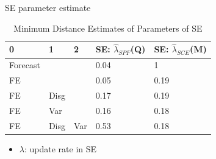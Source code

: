\documentclass{beamer}
\begin{document}
\begin{frame}{SE parameter estimate}
	\begin{table}
		\centering
		\caption{Minimum Distance Estimates of Parameters of SE}
		\label{GMM_Est_SE_Table}
		\begin{tabular}{lllll}
			\hline 
			0        & 1    & 2   & SE: $\hat\lambda_{SPF}$(Q) & SE: $\hat\lambda_{SCE}$(M) \\
			\hline 
			Forecast &      &     & 0.04                       & 1                          \\
			FE       &      &     & 0.05                       & 0.19                       \\
			FE       & Disg &     & 0.17                       & 0.19                       \\
			FE       & Var  &     & 0.16                       & 0.18                       \\
			FE       & Disg & Var & 0.53                       & 0.18                      \\
			\hline 
		\end{tabular}
	\end{table}
\begin{itemize}
	\item $\lambda$: update rate in SE
\end{itemize}
\end{frame}
\end{document}
